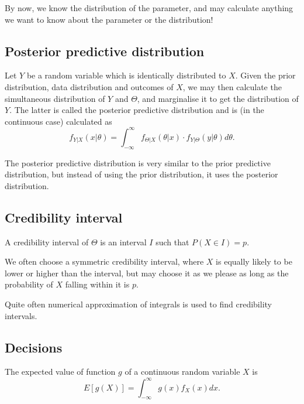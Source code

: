 By now, we know the distribution of the parameter, and may calculate anything we want to know about the parameter or the distribution!

\subsection{Posterior predictive distribution}
\begin{definition}
	Let \(Y\) be a random variable which is identically distributed to \(X\). Given the prior distribution, data distribution and outcomes of \(X\), we may then calculate the simultaneous distribution of \(Y\) and \(\Theta \), and marginalise it to get the distribution of \(Y\). The latter is called the posterior predictive distribution and is (in the continuous case) calculated as
	\[
		f _{Y|X}(x|\theta ) = \int_{-\infty }^{\infty} f _{\Theta |X}(\theta|x )  \cdot f _{Y|\Theta }(y|\theta ) d \theta.
	\]
\end{definition}

\begin{obs}
	The posterior predictive distribution is very similar to the prior predictive distribution, but instead of using the prior distribution, it uses the posterior distribution.
\end{obs}

\subsection{Credibility interval}


\begin{definition}
	A credibility interval of \(\Theta\) is an interval \(I\) such that \(P(X \in I) = p\). 
\end{definition}

\begin{obs}
	We often choose a symmetric credibility interval, where \(X\) is equally likely to be lower or higher than the interval, but may choose it as we please as long as the probability of \(X\) falling within it is \(p\).
\end{obs}

\begin{obs}
	Quite often numerical approximation of integrals is used to find credibility intervals.
\end{obs}

\subsection{Decisions}
\begin{definition}
	The expected value of function \(g\) of a continuous random variable \(X\) is 
	\[
		E\left[g(X)\right] = \int_{-\infty }^{\infty} g(x) f _{X}(x) dx.
	\]
\end{definition}

